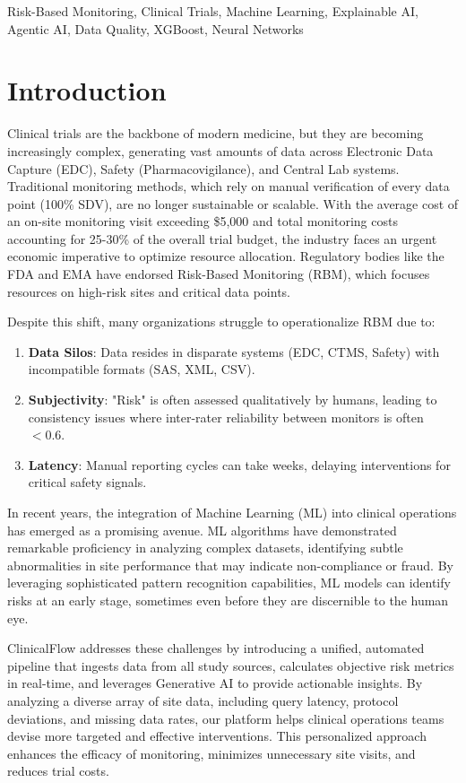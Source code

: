 \documentclass[conference]{IEEEtran}
\begin{document}
\begin{IEEEkeywords}
Risk-Based Monitoring, Clinical Trials, Machine Learning, Explainable AI, Agentic AI, Data Quality, XGBoost, Neural Networks
\end{IEEEkeywords}


\section{Introduction}
Clinical trials are the backbone of modern medicine, but they are becoming increasingly complex, generating vast amounts of data across Electronic Data Capture (EDC), Safety (Pharmacovigilance), and Central Lab systems. Traditional monitoring methods, which rely on manual verification of every data point (100\% SDV), are no longer sustainable or scalable. With the average cost of an on-site monitoring visit exceeding \$5,000 and total monitoring costs accounting for 25-30\% of the overall trial budget, the industry faces an urgent economic imperative to optimize resource allocation. Regulatory bodies like the FDA and EMA have endorsed Risk-Based Monitoring (RBM), which focuses resources on high-risk sites and critical data points.

Despite this shift, many organizations struggle to operationalize RBM due to:
\begin{enumerate}
    \item \textbf{Data Silos}: Data resides in disparate systems (EDC, CTMS, Safety) with incompatible formats (SAS, XML, CSV).
    \item \textbf{Subjectivity}: "Risk" is often assessed qualitatively by humans, leading to consistency issues where inter-rater reliability between monitors is often $< 0.6$.
    \item \textbf{Latency}: Manual reporting cycles can take weeks, delaying interventions for critical safety signals.
\end{enumerate}

In recent years, the integration of Machine Learning (ML) into clinical operations has emerged as a promising avenue. ML algorithms have demonstrated remarkable proficiency in analyzing complex datasets, identifying subtle abnormalities in site performance that may indicate non-compliance or fraud. By leveraging sophisticated pattern recognition capabilities, ML models can identify risks at an early stage, sometimes even before they are discernible to the human eye.

ClinicalFlow addresses these challenges by introducing a unified, automated pipeline that ingests data from all study sources, calculates objective risk metrics in real-time, and leverages Generative AI to provide actionable insights. By analyzing a diverse array of site data, including query latency, protocol deviations, and missing data rates, our platform helps clinical operations teams devise more targeted and effective interventions. This personalized approach enhances the efficacy of monitoring, minimizes unnecessary site visits, and reduces trial costs.
\end{document}
